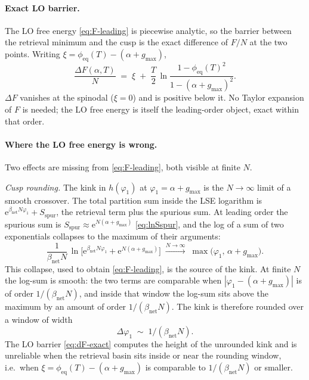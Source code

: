 \documentclass[11pt]{article}
\newcommand{\Bnet}{\beta_{\mathrm{net}}}
\newcommand{\phieq}{\phi_{\mathrm{eq}}}
\begin{document}
\paragraph{Exact LO barrier.}
The LO free energy \eqref{eq:F-leading} is piecewise analytic, so the
barrier between the retrieval minimum and the cusp is the exact
difference of $F/N$ at the two points.  Writing
$\xi = \phieq(T) - (\alpha + g_{\max})$,
\begin{equation}
\frac{\Delta F(\alpha, T)}{N}
   \;=\; \xi \;+\; \frac{T}{2}\,
   \ln\!\frac{1 - \phieq(T)^2}{1 - (\alpha + g_{\max})^2}.
\label{eq:dF-exact}
\end{equation}
$\Delta F$ vanishes at the spinodal ($\xi = 0$) and is positive
below it.  No Taylor expansion of $F$ is needed; the LO free energy
is itself the leading-order object, exact within that order.

\paragraph{Where the LO free energy is wrong.}
Two effects are missing from \eqref{eq:F-leading}, both visible at
finite $N$.

\textit{Cusp rounding.}
The kink in $h(\varphi_1)$ at $\varphi_1 = \alpha + g_{\max}$ is the
$N \to \infty$ limit of a smooth crossover.  The total partition sum
inside the LSE logarithm is
$\mathrm{e}^{\Bnet N \varphi_1} + S_{\mathrm{spur}}$, the retrieval
term plus the spurious sum.  At leading order the spurious sum is
$S_{\mathrm{spur}} \approx \mathrm{e}^{N(\alpha + g_{\max})}$
\eqref{eq:lnSspur}, and the log of a sum of two exponentials
collapses to the maximum of their arguments:
\begin{equation}
\frac{1}{\Bnet N}\,
   \ln\!\bigl[\mathrm{e}^{\Bnet N \varphi_1}
              + \mathrm{e}^{N(\alpha + g_{\max})}\bigr]
   \;\xrightarrow{N\to\infty}\;
   \max\!\bigl(\varphi_1,\,\alpha + g_{\max}\bigr).
\label{eq:logsum-max}
\end{equation}
This collapse, used to obtain \eqref{eq:F-leading}, is the source of
the kink.  At finite $N$ the log-sum is smooth: the two terms are
comparable when $|\varphi_1 - (\alpha + g_{\max})|$ is of order
$1/(\Bnet N)$, and inside that window the log-sum sits above the
maximum by an amount of order $1/(\Bnet N)$.  The kink is therefore
rounded over a window of width
\begin{equation}
\Delta \varphi_1 \;\sim\; 1 / (\Bnet N).
\label{eq:rounding-window}
\end{equation}
The LO barrier \eqref{eq:dF-exact} computes the height of the
unrounded kink and is unreliable when the retrieval basin sits
inside or near the rounding window, i.e.\ when
$\xi = \phieq(T) - (\alpha + g_{\max})$ is comparable to $1/(\Bnet N)$
or smaller.
\end{document}
